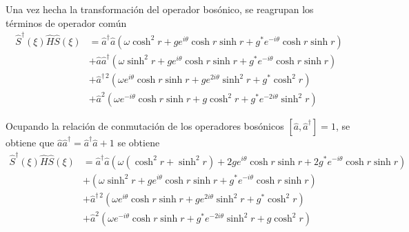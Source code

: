 Una vez hecha la transformación del operador bosónico, se reagrupan los términos de operador común
\begin{align*}
	\hat{S}^{\dagger}(\xi) \hat{H} \hat{S}(\xi)
	 & = \hat{a}^{\dagger} \hat{a} \left( \omega \cosh^2 {r} + ge^{i\theta}\cosh{r}\sinh{r} + g^{*}e^{-i\theta}\cosh{r}\sinh{r} \right) \\
	 & + \hat{a} \hat{a}^{\dagger} \left( \omega \sinh^2 {r} + ge^{i\theta}\cosh{r}\sinh{r} + g^{*}e^{-i\theta}\cosh{r}\sinh{r} \right) \\
	 & + \hat{a}^{\dagger\,2} (\omega e^{i\theta} \cosh{r}\sinh{r} + g e^{2i\theta}\sinh^2{r} + g^{*}\cosh^2 {r})                       \\
	 & + \hat{a}^{2} (\omega e^{-i\theta} \cosh{r}\sinh{r} + g \cosh^2{r} + g^{*} e^{-2i\theta} \sinh^2 {r})
\end{align*}

Ocupando la relación de conmutación de los operadores bosónicos $\left[\hat{a}, \hat{a}^{\dagger}\right] = 1$, se obtiene que $\hat{a}\hat{a}^{\dagger} = \hat{a}^{\dagger}\hat{a}+1$ se obtiene
\begin{align*}
	\hat{S}^{\dagger}(\xi) \hat{H} \hat{S}(\xi)
	 & = \hat{a}^{\dagger} \hat{a} \left( \omega (\cosh^2 {r} + \sinh^2 {r}) + 2ge^{i\theta}\cosh{r}\sinh{r} + 2g^{*}e^{-i\theta}\cosh{r}\sinh{r} \right) \\
	 & + \left( \omega \sinh^2 {r} + ge^{i\theta}\cosh{r}\sinh{r} + g^{*}e^{-i\theta}\cosh{r}\sinh{r} \right)                                             \\
	 & + \hat{a}^{\dagger\,2} (\omega e^{i\theta} \cosh{r}\sinh{r} + g e^{2i\theta}\sinh^2{r} + g^{*}\cosh^2 {r})                                         \\
	 & + \hat{a}^{2} (\omega e^{-i\theta} \cosh{r}\sinh{r} + g^{*} e^{-2i\theta} \sinh^2 {r} + g \cosh^2{r})
\end{align*}

